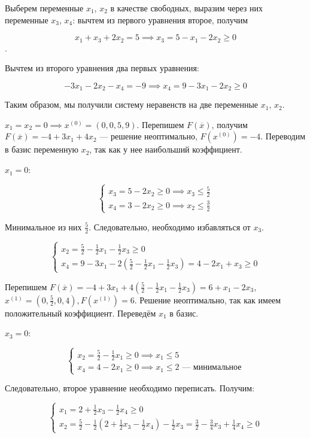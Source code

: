 \documentclass{article}
\begin{document}
Выберем переменные $x_1$, $x_2$ в качестве свободных, выразим через них переменные $x_3$, $x_4$: вычтем из первого уравнения второе, получим  

$$x_1 + x_3 + 2x_2 = 5 \implies x_3 = 5 - x_1 - 2x_2 \ge 0$$.

Вычтем из второго уравнения два первых уравнения:

$$-3x_1 - 2x_2 - x_4 = -9 \implies x_4 = 9 - 3x_1 - 2x_2 \ge 0$$

Таким образом, мы получили систему неравенств на две переменные $x_1$, $x_2$.

$x_1 = x_2 = 0 \implies x^{(0)} = (0,0,5,9)$. Перепишем $F(\overline{x})$, получим $F(\overline{x}) = -4 + 3x_1 + 4x_2$ — решение неоптимально, $F(x^{(0)}) = -4$. Переводим в базис переменную $x_2$, так как у нее наибольший коэффициент.

$x_1 = 0$:

$$
\begin{cases}
    x_3 = 5 - 2x_2 \ge 0 \implies x_3 \le \frac{5}{2} \\
    x_4 = 3 - 2x_2 \ge 0 \implies x_2 \le \frac{3}{2}
\end{cases}
$$

Минимальное из них $\frac{5}{2}$. Следовательно, необходимо избавляться от $x_3$.

$$
\begin{cases}
x_2 = \frac{5}{2} - \frac{1}{2} x_1 - \frac{1}{2} x_3 \ge 0 \\
x_4 = 9 - 3x_1 - 2 (\frac{5}{2} - \frac{1}{2} x_1 - \frac{1}{2} x_3) = 4 - 2x_1 + x_3 \ge 0
\end{cases}
$$

Перепишем $F(\overline{x}) = -4 + 3x_1 + 4 (\frac{5}{2} - \frac{1}{2} x_1 - \frac{1}{2} x_3) = 6 + x_1 - 2x_3$, $x^{(1)} = (0,\frac{5}{2},0,4), F(x^{(1)}) = 6$. Решение неоптимально, так как имеем положительный коэффициент. Переведём $x_1$ в базис.

$x_3 = 0$:

$$
\begin{cases}
  x_2 = \frac{5}{2} - \frac{1}{2} x_1 \ge 0 \implies x_1 \le 5 \\
  x_4 = 4 - 2x_1 \ge 0 \implies x_1 \le 2 \text{ — минимальное}  
\end{cases}
$$

Следовательно, второе уравнение необходимо переписать. Получим:

$$
\begin{cases}
  x_1 = 2 + \frac{1}{2} x_3 - \frac{1}{2} x_4 \ge 0 \\
  x_2 = \frac{5}{2} - \frac{1}{2} (2 + \frac{1}{2} x_3 - \frac{1}{2} x_4) - \frac{1}{2} x_3 = \frac{3}{2} - \frac{3}{4} x_3 + \frac{1}{4} x_4 \ge 0  
\end{cases}
$$
\end{document}
